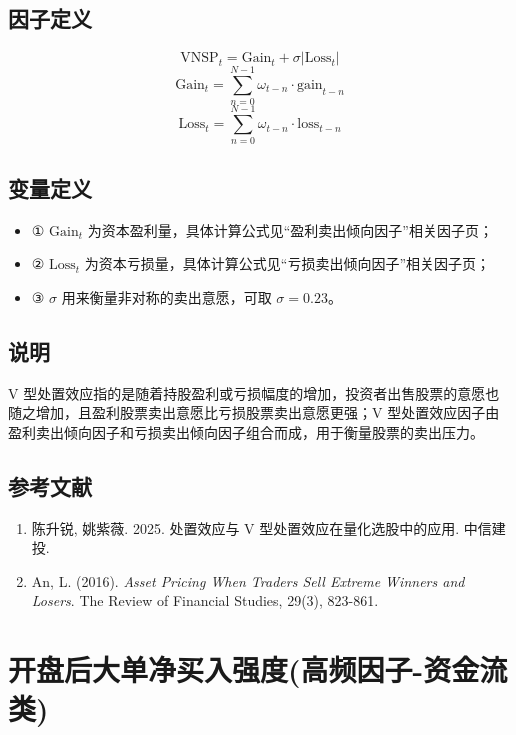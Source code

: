 \documentclass{article}
\begin{document}
\subsection{因子定义}
\begin{equation}
    \mathrm{VNSP}_t = \mathrm{Gain}_t + \sigma |\mathrm{Loss}_t|
\end{equation}
\begin{equation}
    \mathrm{Gain}_t = \sum_{n=0}^{N-1} \omega_{t-n} \cdot \mathrm{gain}_{t-n}
\end{equation}
\begin{equation}
    \mathrm{Loss}_t = \sum_{n=0}^{N-1} \omega_{t-n} \cdot \mathrm{loss}_{t-n}
\end{equation}

\subsection{变量定义}
\begin{itemize}
    \item ① \( \mathrm{Gain}_t \) 为资本盈利量，具体计算公式见“盈利卖出倾向因子”相关因子页；
    \item ② \( \mathrm{Loss}_t \) 为资本亏损量，具体计算公式见“亏损卖出倾向因子”相关因子页；
    \item ③ \( \sigma \) 用来衡量非对称的卖出意愿，可取 \( \sigma = 0.23 \)。
\end{itemize}

\subsection{说明}
V 型处置效应指的是随着持股盈利或亏损幅度的增加，投资者出售股票的意愿也随之增加，且盈利股票卖出意愿比亏损股票卖出意愿更强；V 型处置效应因子由盈利卖出倾向因子和亏损卖出倾向因子组合而成，用于衡量股票的卖出压力。

\subsection{参考文献}
\begin{enumerate}
    \item 陈升锐, 姚紫薇. 2025. 处置效应与 V 型处置效应在量化选股中的应用. 中信建投.
    \item An, L. (2016). \textit{Asset Pricing When Traders Sell Extreme Winners and Losers}. The Review of Financial Studies, 29(3), 823-861.
\end{enumerate}

\section{开盘后大单净买入强度(高频因子-资金流类)}
\end{document}
